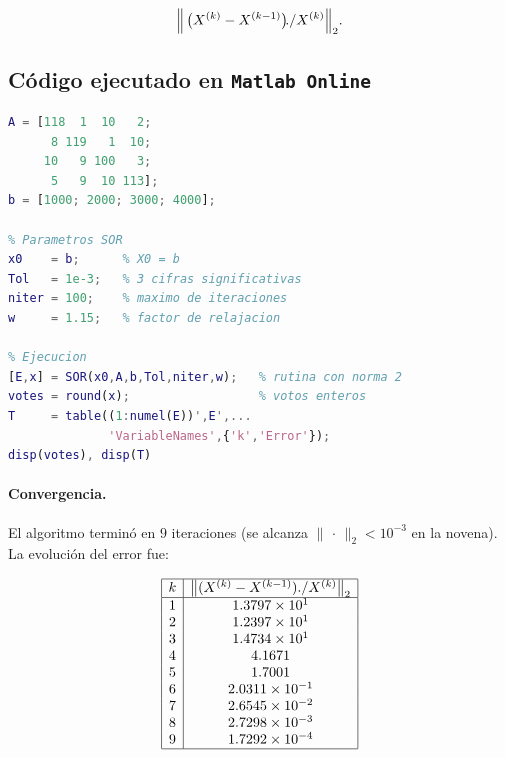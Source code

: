\[
\Bigl\|\,\bigl(X^{(k)}-X^{(k-1)}\bigr)\!./X^{(k)}\Bigr\|_2 .
\]

\subsection*{Código ejecutado en \texttt{Matlab Online}}

\begin{lstlisting}[language=Matlab,basicstyle=\ttfamily\small]
% Matriz y termino independiente
A = [118  1  10   2;
      8 119   1  10;
     10   9 100   3;
      5   9  10 113];
b = [1000; 2000; 3000; 4000];

% Parametros SOR
x0    = b;      % X0 = b
Tol   = 1e-3;   % 3 cifras significativas
niter = 100;    % maximo de iteraciones
w     = 1.15;   % factor de relajacion

% Ejecucion
[E,x] = SOR(x0,A,b,Tol,niter,w);   % rutina con norma 2
votes = round(x);                  % votos enteros
T     = table((1:numel(E))',E',...
              'VariableNames',{'k','Error'});
disp(votes), disp(T)
\end{lstlisting}

\vspace*{-1ex}
\paragraph{Convergencia.}
El algoritmo terminó en \(9\) iteraciones (se alcanza
\(\|\,\cdot\,\|_2<10^{-3}\) en la novena).  
La evolución del error fue:

\[
\begin{array}{|c|c|}
\hline
k & \bigl\|(X^{(k)}-X^{(k-1)}) ./ X^{(k)}\bigr\|_2\\\hline
1 & 1.3797\times10^{1}\\
2 & 1.2397\times10^{1}\\
3 & 1.4734\times10^{1}\\
4 & 4.1671\\
5 & 1.7001\\
6 & 2.0311\times10^{-1}\\
7 & 2.6545\times10^{-2}\\
8 & 2.7298\times10^{-3}\\
9 & 1.7292\times10^{-4}\\\hline
\end{array}
\]

